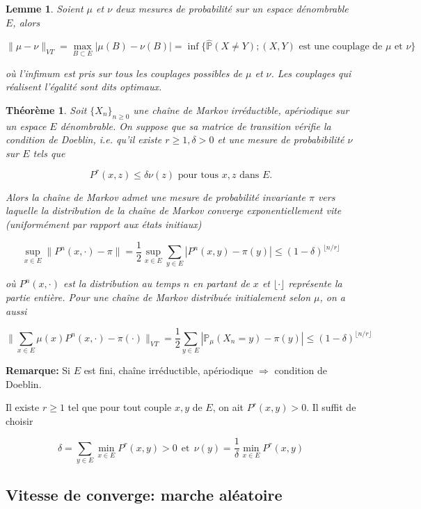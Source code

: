 \documentclass[10pt,a4paper,oneside]{article}
\newtheorem{theoreme}{Théorème}
\newtheorem{lemme}{Lemme}
\begin{document}
\begin{lemme}
Soient $\mu$ et $\nu$ deux mesures de probabilité sur un espace dénombrable $E$, alors

\[ \| \mu - \nu \|_{VT} = \max_{B \subset E} | \mu(B) - \nu(B) | = \inf \{ \widehat{\mathbb{P}}(X \neq Y); (X,Y) \text{ est une couplage de } \mu \text{ et } \nu \} \]

où l'infimum est pris sur tous les couplages possibles de $\mu$ et $\nu$. Les couplages qui réalisent l'égalité sont dits optimaux.
\end{lemme}

\begin{theoreme}
Soit $\{ X_n \}_{n \geq 0}$ une chaîne de Markov irréductible, apériodique sur un espace $E$ dénombrable. On suppose que sa matrice de transition vérifie la condition de Doeblin, i.e. qu'il existe $r \geq 1, \delta > 0$ et une mesure de probabibilité $\nu$ sur $E$ tels que

\[ P^r(x,z) \leq \delta \nu(z) \text{ pour tous } x,z \text{ dans } E. \]

Alors la chaîne de Markov admet une mesure de probabilité invariante $\pi$ vers laquelle la distribution de la chaîne de Markov converge exponentiellement vite (uniformément par rapport aux états initiaux)

\[ \sup_{x \in E} \| P^n(x,\cdot) - \pi \| = \frac{1}{2} \sup_{x \in E} \sum_{y \in E} |P^n(x,y) - \pi(y) | \leq (1 - \delta)^{\lfloor n / r \rfloor} \]

où $P^n(x,\cdot)$ est la distribution au temps $n$ en partant de $x$ et $\lfloor \cdot \rfloor$ représente la partie entière. Pour une chaîne de Markov distribuée initialement selon $\mu$, on a aussi

\[ \| \sum_{x \in E} \mu(x) P^n(x,\cdot) - \pi (\cdot) \|_{VT} = \frac{1}{2} \sum_{y \in E} |\mathbb{P}_\mu (X_n = y) - \pi(y) | \leq (1 - \delta)^{\lfloor n / r \rfloor} \]
\end{theoreme}

\textbf{Remarque:} Si $E$ est fini, chaîne irréductible, apériodique $\Rightarrow$ condition de Doeblin.

Il existe $r \geq 1$ tel que pour tout couple $x,y$ de $E$, on ait $P^r(x,y) > 0$. Il suffit de choisir

\[ \delta = \sum_{y \in E} \min_{x \in E} P^r(x,y) > 0\ \ \text{et}\ \ \nu(y) = \frac{1}{\delta} \min_{x \in E} P^r(x,y) \]

\subsection{Vitesse de converge: marche aléatoire}
\end{document}
